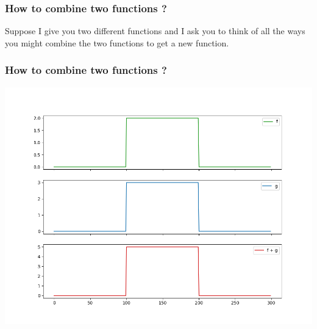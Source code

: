 \documentclass{beamer}
\begin{document}
\begin{frame}
	\frametitle{How to combine two functions ?}
	\center
	Suppose I give you two different functions and I ask you to think of all the ways you might combine the two functions to get a new function.
\end{frame}
\begin{frame}
\frametitle{How to combine two functions ?}
\center
	\includegraphics[scale=0.4]{media/added.png}

\end{frame}
\end{document}
